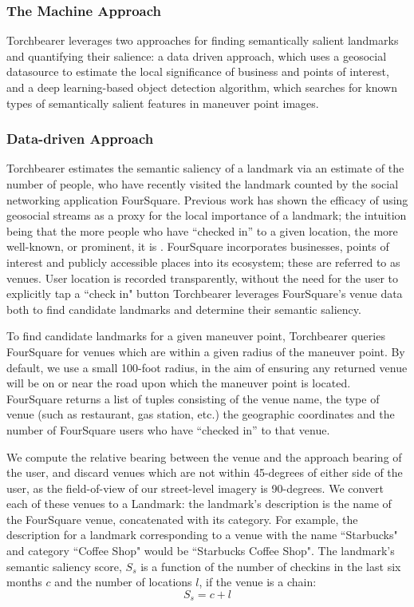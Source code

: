 \subsubsection{The Machine Approach}
Torchbearer leverages two approaches for finding semantically salient landmarks and quantifying their salience: a data driven approach, which uses a geosocial datasource to estimate the local significance of business and points of interest, and a deep learning-based object detection algorithm, which searches for known types of semantically salient features in maneuver point images.
	
\subsubsection{Data-driven Approach}\label{Sect:desc:data}
Torchbearer estimates the semantic saliency of a landmark via an estimate of the number of people, who have recently visited the landmark counted by the social networking application FourSquare. Previous work has shown the efficacy of using geosocial streams as a proxy for the local importance of a landmark; the intuition being that the more people who have “checked in” to a given location, the more well-known, or prominent, it is \cite{quesnot2014measure}. FourSquare incorporates businesses, points of interest and publicly accessible places into its ecosystem; these are referred to as venues. User location is recorded transparently, without the need for the user to explicitly tap a ``check in" button Torchbearer leverages FourSquare’s venue data both to find candidate landmarks and determine their semantic saliency. 

To find candidate landmarks for a given maneuver point, Torchbearer queries FourSquare for venues which are within a given radius of the maneuver point. By default, we use a small 100-foot radius, in the aim of ensuring any returned venue will be on or near the road upon which the maneuver point is located. FourSquare returns a list of tuples consisting of the venue name, the type of venue (such as restaurant, gas station, etc.) the geographic coordinates and the number of FourSquare users who have “checked in” to that venue. 

We compute the relative bearing between the venue and the approach bearing of the user, and discard venues which are not within 45-degrees of either side of the user, as the field-of-view of our street-level imagery is 90-degrees. We convert each of these venues to a Landmark: the landmark's description is the name of the FourSquare venue, concatenated with its category. For example, the description for a landmark corresponding to a venue with the name ``Starbucks" and category ``Coffee Shop" would be ``Starbucks Coffee Shop". The landmark’s semantic saliency score, $S_s$ is a function of the number of checkins in the last six months $c$ and the number of locations $l$, if the venue is a chain:
\begin{equation}
    S_s = c + l
\end{equation}

